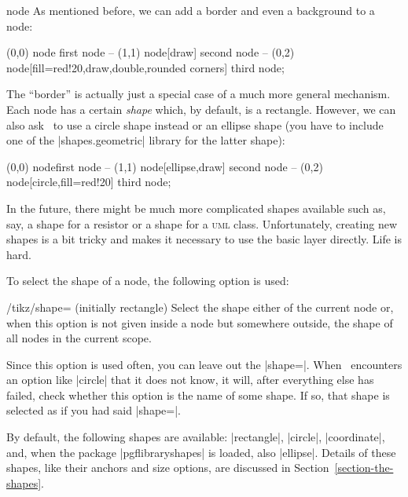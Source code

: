 \begin{pathoperation}{node}{%
    }
  As mentioned before, we can add a border and even a background to a
  node:
\begin{codeexample}[]
\tikz \fill[fill=examplefill]
      (0,0) node {first node}
   -- (1,1) node[draw] {second node}
   -- (0,2) node[fill=red!20,draw,double,rounded corners] {third node};
\end{codeexample}

  The ``border'' is actually just a special case of a much more general
  mechanism. Each node has a certain \emph{shape} which, by default, is
  a rectangle. However, we can also ask \tikzname\ to use a circle shape
  instead or an ellipse shape (you have to include one of the
  |shapes.geometric| library for the latter shape):

\begin{codeexample}[]
\tikz \fill[fill=examplefill]
      (0,0) node{first node}
   -- (1,1) node[ellipse,draw] {second node}
   -- (0,2) node[circle,fill=red!20] {third node};
\end{codeexample}

  In the future, there might be much more complicated shapes available
  such as, say, a shape for a resistor or a shape for a \textsc{uml}
  class. Unfortunately, creating new shapes is a bit tricky and makes
  it necessary to use the basic layer directly. Life is hard.

  To select the shape of a node, the following option is used:
  \begin{key}{/tikz/shape= (initially rectangle)}
    Select the shape either of the current node or, when this option is
    not given inside a node but somewhere outside, the shape of all
    nodes in the current scope.%

    Since this option is used often, you can leave out the
    |shape=|. When \tikzname\ encounters an option like |circle|
    that it does not know, it will, after everything else has failed,
    check whether this option is the name of some shape. If so, that
    shape is selected as if you had said |shape=|.

    By default, the following shapes are available: |rectangle|,            %
    |circle|, |coordinate|, and, when the package |pgflibraryshapes| is
    loaded, also |ellipse|. Details of these shapes, like their anchors
    and size options, are discussed in Section~\ref{section-the-shapes}.
  \end{key}


\end{pathoperation}
